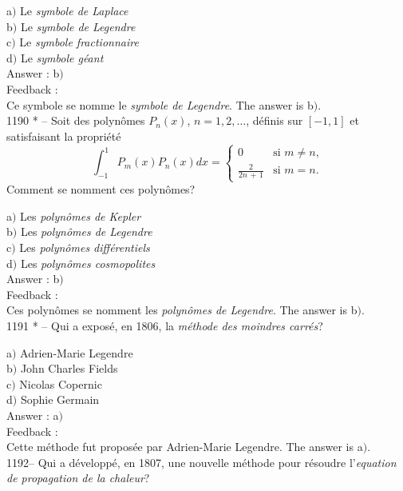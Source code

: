 \documentclass[letterpaper, 12pt]{article}
\begin{document}
a$)$ Le {\sl symbole de Laplace} \\
b$)$ Le {\sl symbole de Legendre} \\
c$)$ Le {\sl symbole fractionnaire} \\
d$)$ Le {\sl symbole g\'eant}\\

Answer : b$)$\\

Feedback : \\
Ce symbole se nomme le {\sl symbole de Legendre}.
The answer is b$)$.\\

1190 * -- Soit des polyn\^omes $P_n(x)$, $n=1,2,\ldots$, d\'efinis sur
$[-1,1]$ et satisfaisant la propri\'et\'e
$$\displaystyle{\int_{-1}^1P_m(x)P_n(x)dx=}\begin{cases}
0&\text{si $m\not=n$,}\\[3mm]
\frac2{2n\,+\,1}&\text{si $m=n$.}
\end{cases}$$
Comment se nomment ces polyn\^omes?

a$)$ Les {\sl polyn\^omes de Kepler} \\
b$)$ Les {\sl polyn\^omes de Legendre} \\
c$)$ Les {\sl polyn\^omes diff\'erentiels} \\
d$)$ Les {\sl polyn\^omes cosmopolites}\\

Answer : b$)$\\

Feedback : \\
Ces polyn\^omes se nomment les {\sl polyn\^omes de Legendre}.
The answer is b$)$.\\

1191 * -- Qui a expos\'e, en 1806, la {\sl m\'ethode des moindres
carr\'es}?

a$)$ Adrien-Marie Legendre \\
b$)$ John Charles Fields \\
c$)$ Nicolas Copernic \\
d$)$ Sophie Germain\\

Answer : a$)$\\

Feedback : \\
Cette m\'ethode fut propos\'ee par Adrien-Marie Legendre.
The answer is a$)$.\\

1192-- Qui a d\'evelopp\'e, en 1807, une nouvelle m\'ethode pour
r\'esoudre l'{\sl equation de propagation de la chaleur}?
\end{document}
